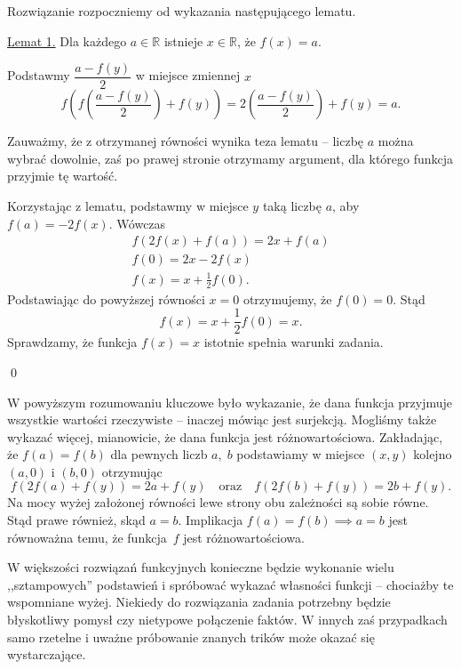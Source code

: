 \newpage


\noindent
Rozwiązanie rozpoczniemy od wykazania następującego lematu.

\vspace{10px}

\noindent
\underline{Lemat 1.} Dla każdego $a \in \mathbb{R}$ istnieje $x \in \mathbb{R}$, że $f(x) = a$.

\vspace{5px}

\noindent
Podstawmy $\dfrac{a - f(y)}{2}$ w miejsce zmiennej $x$
\[
    f\left(f\left(\frac{a - f(y)}{2}\right) + f(y)\right) = 2\left(\frac{a - f(y)}{2}\right) + f(y) = a.
\]

\noindent
Zauważmy, że z otrzymanej równości wynika teza lematu – liczbę $a$ można wybrać dowolnie, zaś po prawej stronie otrzymamy argument, dla którego funkcja przyjmie tę wartość.

\vspace{10px}

\noindent
Korzystając z lematu, podstawmy w miejsce $y$ taką liczbę $a$, aby $f(a) = -2f(x)$. Wówczas
\begin{gather*}
    f(2f(x) + f(a)) = 2x + f(a) \\
     f(0) = 2x - 2f(x) \\
    f(x) = x  + \frac{1}{2}f(0).
\end{gather*}
Podstawiając do powyższej równości $x = 0$ otrzymujemy, że $f(0) = 0$. Stąd
\[
    f(x) = x + \frac{1}{2}f(0) = x.
\]
Sprawdzamy, że funkcja $f(x) = x$ istotnie spełnia warunki zadania.

\qed

\vspace{10px}

\noindent
W powyższym rozumowaniu kluczowe było wykazanie, że dana funkcja przyjmuje wszystkie wartości rzeczywiste -- inaczej mówiąc jest surjekcją. Mogliśmy także wykazać więcej, mianowicie, że dana funkcja jest różnowartościowa. Zakładając, że $f(a) = f(b)$ dla pewnych liczb $a,\;b$ podstawiamy w miejsce $(x, y)$ kolejno $(a, 0)$ i $(b, 0)$ otrzymując
\[
    f(2f(a) + f(y)) = 2a + f(y) \quad \text{oraz} \quad f(2f(b) + f(y)) = 2b + f(y).
\]
Na mocy wyżej założonej równości lewe strony obu zależności są sobie równe. Stąd prawe również, skąd $a = b$. Implikacja $f(a) = f(b) \implies a = b$ jest równoważna temu, że funkcja~$f$ jest różnowartościowa.

\vspace{10px}

\noindent
W większości rozwiązań funkcyjnych konieczne będzie wykonanie wielu ,,sztampowych'' podstawień i spróbować wykazać własności funkcji -- chociażby te wspomniane wyżej. Niekiedy do rozwiązania zadania potrzebny będzie błyskotliwy pomysł czy nietypowe połączenie faktów. W innych zaś przypadkach samo rzetelne i uważne próbowanie znanych trików może okazać się wystarczające. 

\vspace{10px}
